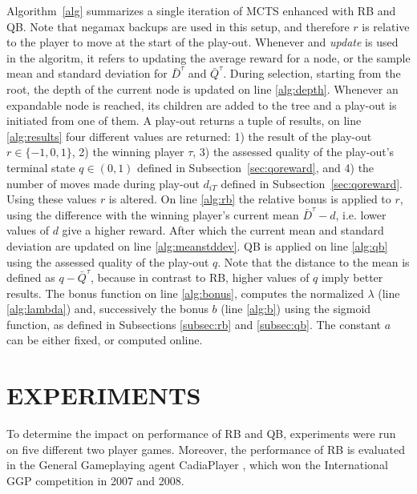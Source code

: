 \documentclass{ecai2014}
\begin{document}
Algorithm~\ref{alg} summarizes a single iteration of MCTS enhanced with RB and QB. Note that negamax backups are used in this setup, and therefore $r$ is relative to the player to move at the start of the play-out. Whenever and \emph{update} is used in the algoritm, it refers to updating the average reward for a node, or the sample mean and standard deviation for $\bar{D}^\tau$ and $\bar{Q}^\tau$. During selection, starting from the root, the depth of the current node is updated on line \ref{alg:depth}. Whenever an expandable node is reached, its children are added to the tree and a play-out is initiated from one of them. A play-out returns a tuple of results, on line \ref{alg:results} four different values are returned: 1) the result of the play-out $r \in \{-1, 0, 1\}$, 2) the winning player $\tau$, 3) the assessed quality of the play-out's terminal state $q \in (0,1)$ defined in Subsection~\ref{sec:qoreward}, and 4) the number of moves made during play-out $d_{iT}$ defined in Subsection~\ref{sec:qoreward}. Using these values $r$ is altered. On line \ref{alg:rb} the relative bonus is applied to $r$, using the difference with the winning player's current mean $\bar{D}^\tau - d$, i.e. lower values of $d$ give a higher reward. After which the current mean and standard deviation are updated on line \ref{alg:meanstddev}. QB is applied on line \ref{alg:qb} using the assessed quality of the play-out $q$. Note that the distance to the mean is defined as $q - \bar{Q}^\tau$, because in contrast to RB, higher values of $q$ imply better results. The {\sc bonus} function on line \ref{alg:bonus}, computes the normalized $\lambda$ (line \ref{alg:lambda}) and, successively the bonus $b$ (line \ref{alg:b}) using the sigmoid function, as defined in Subsections \ref{subsec:rb} and \ref{subsec:qb}. The constant $a$ can be either fixed, or computed online.

\section{EXPERIMENTS}
\label{sec:experiments}
To determine the impact on performance of RB and QB, experiments were run on five different two player games. Moreover, the performance of RB is evaluated in the General Gameplaying agent {\sc CadiaPlayer} \cite{bjornsson2009cadiaplayer}, which won the International GGP competition in 2007 and 2008. 
\end{document}
